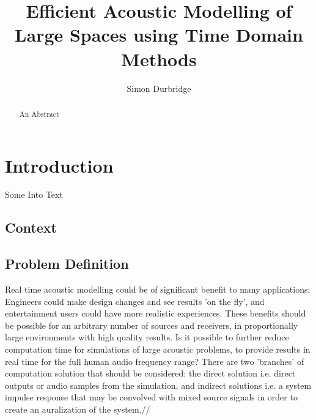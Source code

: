 \documentclass{svproc}
\title{Efficient Acoustic Modelling of Large Spaces using Time Domain Methods} %
\author{Simon Durbridge} %
\institute{Dept. Engineering, Mathematics \&\ Computing\\ University of Derby\\
\email{s.durbridge1@unimail.derby.ac.uk} %
} %
\begin{document}
\maketitle %


\begin{abstract}
An Abstract


\end{abstract}










\section{Introduction}
Some Into Text

\subsection{Context}

\subsection{Problem Definition}
Real time acoustic modelling could be of significant benefit to many applications; Engineers could make design changes and see results 'on the fly', and entertainment users could have more realistic experiences. These benefits should be possible for an arbitrary number of sources and receivers, in proportionally large environments with high quality results. Is it possible to further reduce computation time for simulations of large acoustic problems, to provide results in real time for the full human audio frequency range? There are two 'branches' of computation solution that should be considered: the direct solution i.e. direct outputs or audio samples from the simulation, and indirect solutions i.e. a system impulse response that may be convolved with mixed source signals in order to create an auralization of the system.//
\end{document}
